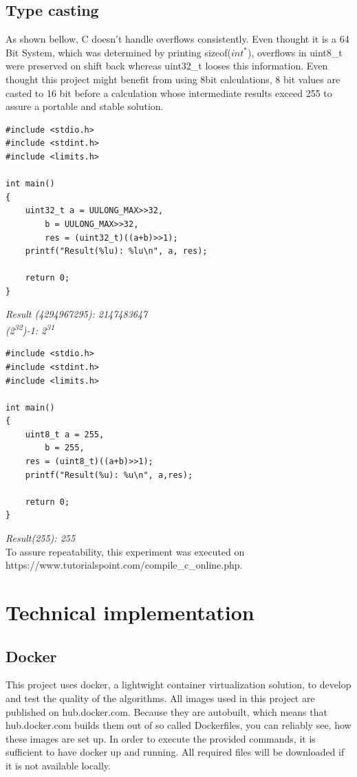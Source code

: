 \section{Type casting}
As shown bellow, C doesn't handle overflows consistently. Even thought it is a 64 Bit System, which was determined by printing sizeof($int^*$), overflows in uint8\_t were preserved on shift back whereas uint32\_t looses this information. Even thought this project might benefit from using 8bit calculations, 8 bit values are casted to 16 bit before a calculation whose intermediate results exceed 255 to assure a portable and stable solution.

\begin{verbatim}
#include <stdio.h>
#include <stdint.h>
#include <limits.h>

int main()
{
	uint32_t a = UULONG_MAX>>32,
		b = UULONG_MAX>>32,
		res = (uint32_t)((a+b)>>1);
	printf("Result(%lu): %lu\n", a, res);
	
	return 0;
}
\end{verbatim}
\textit{ Result (4294967295): 2147483647 \\
	(2\textsuperscript{32})-1: 2\textsuperscript{31}
}
\begin{verbatim}
#include <stdio.h>
#include <stdint.h>
#include <limits.h>

int main()
{
	uint8_t a = 255,
		b = 255,
	res = (uint8_t)((a+b)>>1);
	printf("Result(%u): %u\n", a,res);
	
	return 0;
}

\end{verbatim}
\textit{ Result(255): 255 } \\
To assure repeatability, this experiment was executed on \\ https://www.tutorialspoint.com/compile\_c\_online.php.


\chapter {Technical implementation}
\section{ Docker }
This project uses docker, a lightwight container virtualization solution, to develop and test the quality of the algorithms. All images used in this project are published on hub.docker.com. Because they are autobuilt, which means that hub.docker.com builds them out of so called Dockerfiles, you can reliably see, how these images are set up. In order to execute the provided commands, it is sufficient to have docker up and running. All required files will be downloaded if it is not available locally.

